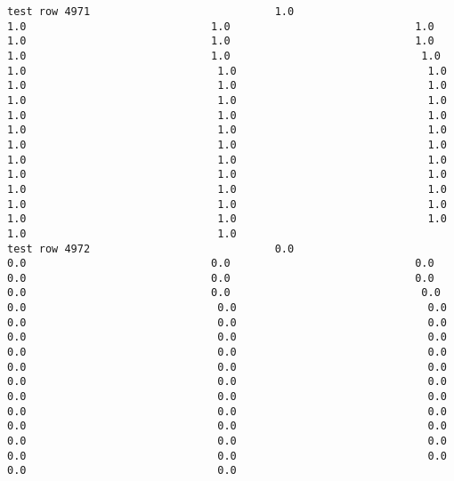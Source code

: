 \documentclass[11pt]{article}
\begin{document}
\begin{verbatim}
test row 4971                             1.0                             1.0                             1.0                             1.0                             1.0                             1.0                             1.0                             1.0                             1.0                              1.0                              1.0                              1.0                              1.0                              1.0                              1.0                              1.0                              1.0                              1.0                              1.0                              1.0                              1.0                              1.0                              1.0                              1.0                              1.0                              1.0                              1.0                              1.0                              1.0                              1.0                              1.0                              1.0                              1.0                              1.0                              1.0                              1.0                              1.0                              1.0                              1.0                              1.0                              1.0                              1.0                              1.0                              1.0                              1.0
test row 4972                             0.0                             0.0                             0.0                             0.0                             0.0                             0.0                             0.0                             0.0                             0.0                              0.0                              0.0                              0.0                              0.0                              0.0                              0.0                              0.0                              0.0                              0.0                              0.0                              0.0                              0.0                              0.0                              0.0                              0.0                              0.0                              0.0                              0.0                              0.0                              0.0                              0.0                              0.0                              0.0                              0.0                              0.0                              0.0                              0.0                              0.0                              0.0                              0.0                              0.0                              0.0                              0.0                              0.0                              0.0                              0.0

\end{verbatim}
\end{document}

